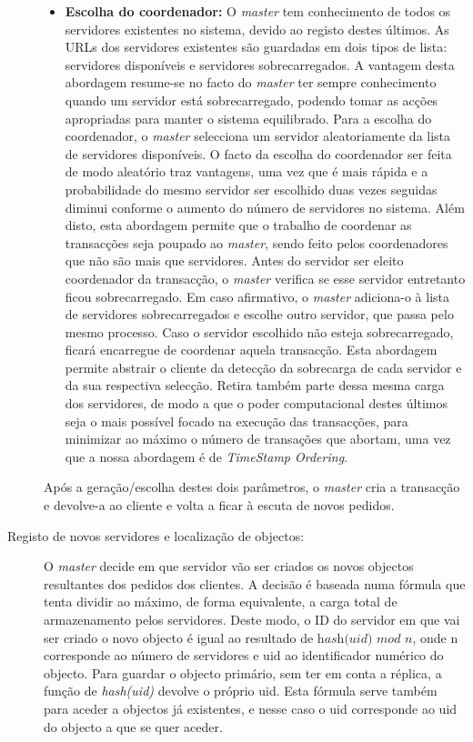 \begin{description}
\begin{itemize}
\item \textbf{Escolha do coordenador:} O \textit{master} tem conhecimento de todos os servidores existentes no sistema, devido ao registo destes últimos. As URLs dos servidores existentes são guardadas em dois tipos de lista: servidores disponíveis e servidores sobrecarregados. A vantagem desta abordagem resume-se no facto do \textit{master} ter  sempre conhecimento quando um servidor está sobrecarregado, podendo tomar as acções apropriadas para manter o sistema equilibrado.
Para a escolha do coordenador, o \textit{master} selecciona um servidor aleatoriamente da lista de servidores disponíveis. O facto da escolha do coordenador ser feita de modo aleatório traz vantagens, uma vez que é mais rápida e a probabilidade do mesmo servidor ser escolhido duas vezes seguidas diminui conforme o aumento do número de servidores no sistema. Além disto, esta abordagem permite que o trabalho de coordenar as transacções seja poupado ao \textit{master}, sendo feito pelos coordenadores que não são mais que servidores.
Antes do servidor ser eleito coordenador da transacção, o \textit{master} verifica se esse servidor entretanto ficou sobrecarregado. Em caso afirmativo, o \textit{master} adiciona-o à lista de servidores sobrecarregados e escolhe outro servidor, que passa pelo mesmo processo. Caso o servidor escolhido não esteja sobrecarregado, ficará encarregue de coordenar aquela transacção.  Esta abordagem permite abstrair o cliente da detecção da sobrecarga de cada servidor e da sua respectiva selecção. Retira também parte dessa mesma carga dos servidores, de modo a que o poder computacional destes últimos seja o mais possível focado na execução das transacções, para minimizar ao máximo o número de transações que abortam, uma vez que a nossa abordagem é de \textit{TimeStamp Ordering}\cite{ex1}.
\end{itemize}
Após a geração/escolha destes dois parâmetros, o \textit{master} cria a transacção e devolve-a ao cliente e volta a ficar à escuta de novos pedidos.

\item[Registo de novos servidores e localização de objectos:]
O \textit{master} decide em que servidor vão ser criados os novos objectos resultantes dos pedidos dos clientes. A decisão é baseada numa fórmula que tenta dividir ao máximo, de forma equivalente, a carga total de armazenamento pelos servidores. Deste modo, o ID do servidor em que vai ser criado o novo objecto é igual ao resultado de $ \textit{hash(uid) mod n} $, onde n corresponde ao número de servidores e uid ao identificador numérico do objecto. Para guardar o objecto primário, sem ter em conta a réplica, a função de \textit{hash(uid)} devolve o próprio uid. Esta fórmula serve também para aceder a objectos já existentes, e nesse caso o uid corresponde ao uid do objecto a que se quer aceder.


\end{description}
